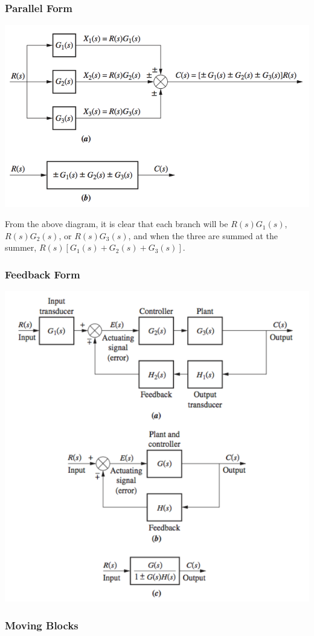 \documentclass[11pt]{article}
\begin{document}
    \subsubsection{Parallel Form}

    \begin{center}
        \includegraphics[width=300 px]{img/parallel} \\
    \end{center}

    From the above diagram, it is clear that each branch will be $R(s)G_1(s)$, $R(s)G_2(s)$, or $R(s)G_3(s)$, and when the three are summed at the summer, $R(s)[G_1(s) + G_2(s) + G_3(s)]$. 

    \subsubsection{Feedback Form}

    \begin{center}
        \includegraphics[width=300 px]{img/feedback} \\
    \end{center}

    \subsubsection{Moving Blocks}
\end{document}
